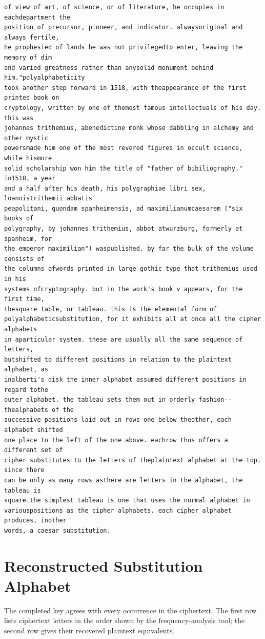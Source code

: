\documentclass[12pt,a4paper]{article}
\begin{document}
\begin{lstlisting}[caption={Complete text after iteration 12}, label={lst:iter12}]
of view of art, of science, or of literature, he occupies in eachdepartment the
position of precursor, pioneer, and indicator. alwaysoriginal and always fertile,
he prophesied of lands he was not privilegedto enter, leaving the memory of dim
and varied greatness rather than anysolid monument behind him."polyalphabeticity
took another step forward in 1518, with theappearance of the first printed book on
cryptology, written by one of themost famous intellectuals of his day. this was
johannes trithemius, abenedictine monk whose dabbling in alchemy and other mystic
powersmade him one of the most revered figures in occult science, while hismore
solid scholarship won him the title of "father of bibiliography." in1518, a year
and a half after his death, his polygraphiae libri sex, loannistrithemii abbatis
peapolitani, quondam spanheimensis, ad maximilianumcaesarem ("six books of
polygraphy, by johannes trithemius, abbot atwurzburg, formerly at spanheim, for
the emperor maximilian") waspublished. by far the bulk of the volume consists of
the columns ofwords printed in large gothic type that trithemius used in his
systems ofcryptography. but in the work's book v appears, for the first time,
thesquare table, or tableau. this is the elemental form of
polyalphabeticsubstitution, for it exhibits all at once all the cipher alphabets
in aparticular system. these are usually all the same sequence of letters,
butshifted to different positions in relation to the plaintext alphabet, as
inalberti's disk the inner alphabet assumed different positions in regard tothe
outer alphabet. the tableau sets them out in orderly fashion--thealphabets of the
successive positions laid out in rows one below theother, each alphabet shifted
one place to the left of the one above. eachrow thus offers a different set of
cipher substitutes to the letters of theplaintext alphabet at the top. since there
can be only as many rows asthere are letters in the alphabet, the tableau is
square.the simplest tableau is one that uses the normal alphabet in
variouspositions as the cipher alphabets. each cipher alphabet produces, inother
words, a caesar substitution.
\end{lstlisting}

\clearpage

\section{Reconstructed Substitution Alphabet}
The completed key agrees with every occurrence in the ciphertext. The first row lists ciphertext letters in the order shown by the frequency-analysis tool; the second row gives their recovered plaintext equivalents.
\end{document}
